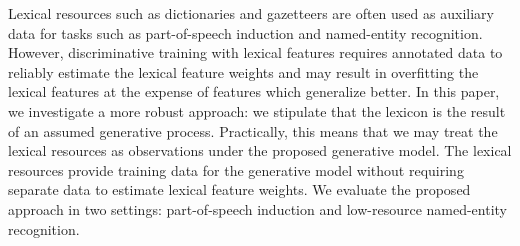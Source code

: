 Lexical resources such as dictionaries and gazetteers are often used as auxiliary data for tasks such as part-of-speech induction and named-entity recognition. However, discriminative training with lexical features requires annotated data to reliably estimate the lexical feature weights and may result in overfitting the lexical features at the expense of features which generalize better. In this paper, we investigate a more robust approach: we stipulate that the lexicon is the result of an assumed generative process. Practically, this means that we may treat the lexical resources as observations under the proposed generative model. The lexical resources provide training data for the generative model without requiring separate data to estimate lexical feature weights. We evaluate the proposed approach in two settings: part-of-speech induction and low-resource named-entity recognition.
